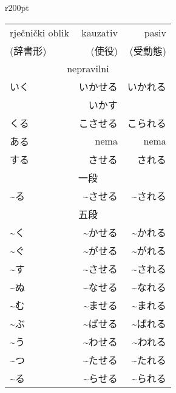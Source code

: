 
\author{Tomislav Mamić}

	
	
	\begin{wraptable}{r}{200pt}
		\centering
		\begin{tabular}{l r r}\toprule[2pt]
			rječnički oblik & kauzativ & pasiv\\
			(辞書形) & (使役) & (受動態)\\
			\midrule
			\multicolumn{3}{c}{nepravilni}\\
			\midrule
			いく & いかせる & いかれる\\
			& いかす & \\
			くる & こさせる & こられる\\
			ある & nema\footnotemark[1] & nema\footnotemark[1]\\
			する & させる & される\\
			\midrule
			\multicolumn{3}{c}{一段}\\
			\midrule
			\textasciitilde る & \textasciitilde させる & \textasciitilde される\footnotemark[2]\\
			\midrule
			\multicolumn{3}{c}{五段}\\
			\midrule
			\textasciitilde く & \textasciitilde かせる & \textasciitilde かれる\\
			\textasciitilde ぐ & \textasciitilde がせる & \textasciitilde がれる\\\vspace{5pt}
			\textasciitilde す & \textasciitilde させる & \textasciitilde される\\
			\textasciitilde ぬ & \textasciitilde なせる & \textasciitilde なれる\\
			\textasciitilde む & \textasciitilde ませる & \textasciitilde まれる\\\vspace{5pt}
			\textasciitilde ぶ & \textasciitilde ばせる & \textasciitilde ばれる\\
			\textasciitilde う & \textasciitilde わせる & \textasciitilde われる\\
			\textasciitilde つ & \textasciitilde たせる & \textasciitilde たれる\\
			\textasciitilde る & \textasciitilde らせる & \textasciitilde られる\\
			\bottomrule[2pt]
		\end{tabular}
	\end{wraptable}

